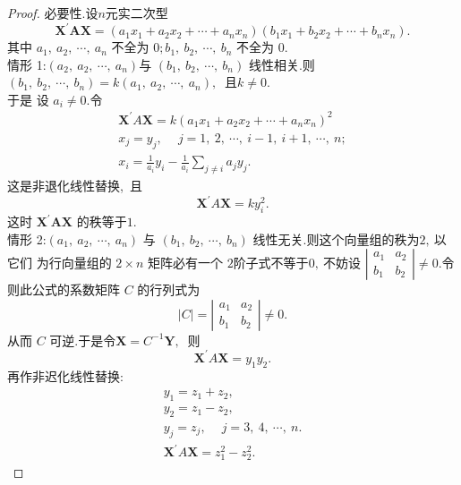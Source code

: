 \begin{proof}
	必要性.设$  n  $元实二次型
	$$\boldsymbol{X}^{\prime} \mathbf{A} \boldsymbol{X}=\left(a_{1} x_{1}+a_{2} x_{2}+\cdots+a_{n} x_{n}\right)\left(b_{1} x_{1}+b_{2} x_{2}+\cdots+b_{n} x_{n}\right) .$$
	其中  $a_{1},\  a_{2},\  \cdots,\  a_{n}$  不全为  $0 ; b_{1},\  b_{2},\  \cdots,\  b_{n} $ 不全为 $0 .$\\
	情形  1:$\left(a_{2},\  a_{2},\  \cdots,\  a_{n}\right)  $与  $\left(b_{1},\  b_{2},\  \cdots,\  b_{n}\right) $ 线性相关.则 $ \left(b_{1},\  b_{2},\  \cdots,\  b_{n}\right)=k\left(a_{1},\  a_{2}\right. ,\   \left.\cdots,\  a_{n}\right) ,\ $ 且$  k \neq 0 .$\\
	于是
	设 $ a_{i} \neq 0. $令
	$$\begin{array}{l}
		\boldsymbol{X}^{\prime} A \boldsymbol{X}=k\left(a_{1} x_{1}+a_{2} x_{2}+\cdots+a_{n} x_{n}\right)^{2} \\
		x_{j}=y_{j},\  \quad j=1,\ 2,\  \cdots,\  i-1,\  i+1,\  \cdots,\  n ; \\
		x_{i}=\frac{1}{a_{i}} y_{i}-\frac{1}{a_{i}} \sum_{j \neq i} a_{j} y_{j} .
	\end{array}$$
	这是非退化线性替换,\ 且
	$$\boldsymbol{X}^{\prime} A \boldsymbol{X}=k y_{i}^{2} .$$
	这时 $ \boldsymbol{X}^{\prime} \mathbf{A X} $ 的秩等于$ 1 .$\\
	情形  2:$\left(a_{1},\  a_{2},\  \cdots,\  a_{n}\right) $ 与 $ \left(b_{1},\  b_{2},\  \cdots,\  b_{n}\right) $ 线性无关.则这个向量组的秩为$ 2 ,\  $以它们 为行向量组的 $ 2 \times n $ 矩阵必有一个 $2 $阶子式不等于$ 0 ,\  $不妨设 $ \left|\begin{array}{ll}a_{1} & a_{2} \\ b_{1} & b_{2}\end{array}\right| \neq 0 .$令
	则此公式的系数矩阵 $ C$  的行列式为
	$$|C|=\left|\begin{array}{ll}
		a_{1} & a_{2} \\
		b_{1} & b_{2}
	\end{array}\right| \neq 0 .$$
	从而 $ C $ 可逆.于是令$  \boldsymbol{X}=C^{-1} \boldsymbol{Y} ,\ $ 则
	$$\boldsymbol{X}^{\prime} A \boldsymbol{X}=y_{1} y_{2} .$$
	再作非迟化线性替换:
	$$\begin{array}{l}
		y_{1}=z_{1}+z_{2},\  \\
		y_{2}=z_{1}-z_{2},\  \\
		y_{j}=z_{j},\  \quad j=3,\ 4,\  \cdots,\  n . \\
		\boldsymbol{X}^{\prime} A \boldsymbol{X}=z_{1}^{2}-z_{2}^{2} .
	\end{array}$$

\end{proof}
